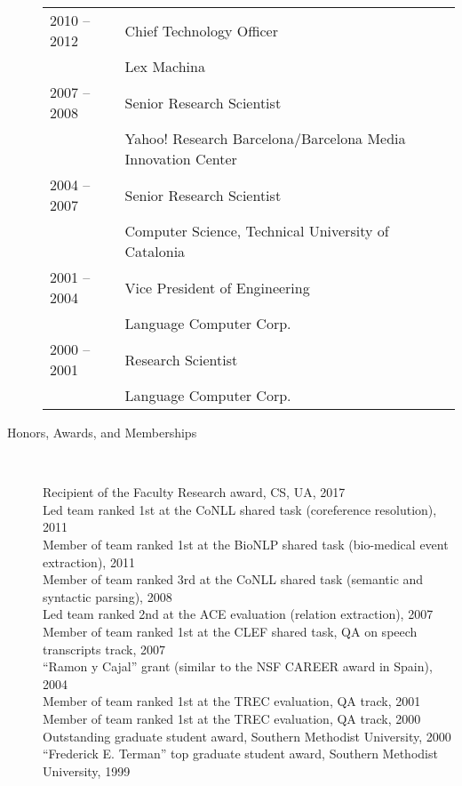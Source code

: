 \documentclass[10pt]{article}
\begin{document}
\begin{description}
\begin{tabular}{lp{4.9in}}
\hspace{-.2cm}2010 -- 2012 & Chief Technology Officer\\\vspace{.1cm}
& {\sc Lex Machina} \\

\hspace{-.2cm}2007 -- 2008 & Senior Research Scientist\\\vspace{.1cm}
& {\sc Yahoo! Research Barcelona/Barcelona Media Innovation Center} \\

\hspace{-.2cm}2004 -- 2007 & Senior Research Scientist\\\vspace{.1cm}
& Computer Science, {\sc Technical University of Catalonia} \\

\hspace{-.2cm}2001 -- 2004 & Vice President of Engineering\\\vspace{.1cm}
& {\sc Language Computer Corp.} \\

\hspace{-.2cm}2000 -- 2001 & Research Scientist\\
& {\sc Language Computer Corp.} 

\end{tabular}

\vspace{-.3cm}
\item [Honors, Awards, and Memberships]\

Recipient of the Faculty Research award, CS, UA, 2017 \\
Led team ranked 1st  at the CoNLL shared task (coreference resolution), 2011 \\
Member of team ranked 1st at the BioNLP shared task (bio-medical event extraction), 2011\\
Member of team ranked 3rd at the CoNLL shared task (semantic and syntactic parsing), 2008\\
Led team ranked 2nd at the ACE evaluation (relation extraction), 2007\\
Member of team ranked 1st at the CLEF shared task, QA on speech transcripts track, 2007\\
``Ramon y Cajal'' grant (similar to the NSF CAREER award in Spain), 2004 \\
Member of team ranked 1st at the TREC evaluation, QA track, 2001\\
Member of team ranked 1st at the TREC evaluation, QA track, 2000 \\
Outstanding graduate student award, Southern Methodist University, 2000 \\
``Frederick E. Terman'' top graduate student award, Southern Methodist University, 1999 \\


\end{description}
\end{document}
